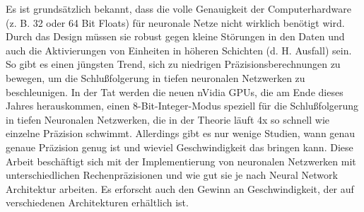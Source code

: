 Es ist grundsätzlich bekannt, dass die volle Genauigkeit der Computerhardware (z. B. 32 oder 64 Bit Floats) für neuronale Netze nicht wirklich benötigt wird. Durch das Design müssen sie robust gegen kleine Störungen in den Daten und auch die Aktivierungen von Einheiten in höheren Schichten (d. H. Ausfall) sein. So gibt es einen jüngsten Trend, sich zu niedrigen Präzisionsberechnungen zu bewegen, um die Schlußfolgerung in tiefen neuronalen Netzwerken zu beschleunigen. In der Tat werden die neuen nVidia GPUs, die am Ende dieses Jahres herauskommen, einen 8-Bit-Integer-Modus speziell für die Schlußfolgerung in tiefen Neuronalen Netzwerken, die in der Theorie läuft 4x so schnell wie einzelne Präzision schwimmt. Allerdings gibt es nur wenige Studien, wann genau genaue Präzision genug ist und wieviel Geschwindigkeit das bringen kann. Diese Arbeit beschäftigt sich mit der Implementierung von neuronalen Netzwerken mit unterschiedlichen Rechenpräzisionen und wie gut sie je nach Neural Network Architektur arbeiten. Es erforscht auch den Gewinn an Geschwindigkeit, der auf verschiedenen Architekturen erhältlich ist.